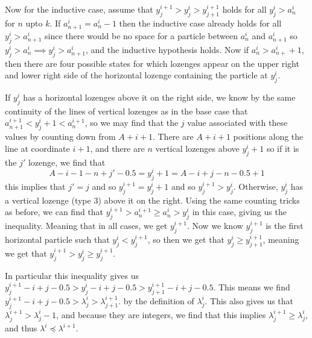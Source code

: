 \documentclass[12pt]{article}
\begin{document}
		Now for the inductive case, assume that $y_j^{i+1}>y_j^{i}>y_{j+1}^{i+1}$ holds for all $y_j^i>a_n^i$ for $n$ upto $k$. If $a_{n+1}^{i}=a_n^i-1$ then the inductive case already holds for all $y_j^i>a_{n+1}^i$ since there would be no space for a particle between $a_n^i$ and $a_{n+1}^i$ so $y_j^i>a_n^i\implies y_j^i>a_{n+1}^i$, and the inductive hypothesis holds. Now if $a_n^i>a_{n+}^i+1$, then there are four possible states for which lozenges appear on the upper right and lower right side of the horizontal lozenge containing the particle at $y_j^i$. 
		
		If $y_j^i$ has a horizontal lozenges above it on the right side, we know by the same continuity of the lines of vertical lozenges as in the base case that $a_{n+1}^{i+1}< y_{j}^{i}+1<a_n^{i+1}$, so we may find that the $j$ value associated with these values by counting down from $A+i+1$. There are $A+i+1$ positions along the line at coordinate $i+1$, and there are $n$ vertical lozenges above $y_j^i+1$ so if it is the $j'$ lozenge, we find that $$A-i-1-n+j'-0.5=y_j^i+1=A-i+j-n-0.5+1$$  this implies that $j'= j$ and so $y^{i+1}_{j}=y^{i}_j+1$ and so $y_{j}^{i+1}>y^i_j$. Otherwise, $y_j^i$ has a vertical lozenge (type 3) above it on the right. Using the same counting tricks as before, we can find that $y_{j}^{i+1}>a_{n}^{i+1}\geq a_n^i>y_j^i$ in this case, giving us the inequality. Meaning that in all cases, we get $y_{j}^{i+1}$.  Now we  know $y_{j}^{i+1}$ is the first horizontal particle such that $y_j^i<y_j^{i+1}$, so then we get that $y_j^i\geq y_{j+1}^{i+1}$, meaning we get that $y_j^{i+1}>y_j^i\geq y_j^{i+1}$. 
		
		In particular this inequality gives us $y_j^{i+1}-i+j-0.5>y_j^i-i+j-0.5>y^{i+1}_{j+1}-i+j-0.5$. This means we find $y_j^{i+1}-i+j-0.5>\lambda_j^i>\lambda_{j+1}^{i+1}$.  by the definition of $\lambda_j^i$. This also gives us that $\lambda_j^{i+1}>\lambda_j^i-1$, and because they are integers, we find that this implies $\lambda_j^{i+1}\geq\lambda_j^i$, and thus $\lambda^i\preceq \lambda^{i+1}$.
		
\end{document}
